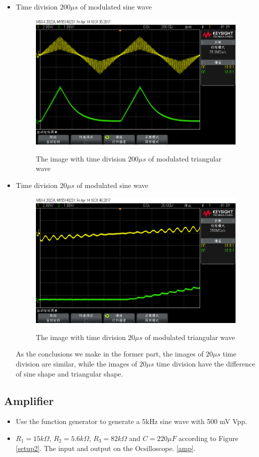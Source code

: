 \documentclass{article}
\begin{document}
\begin{itemize}
\item Time division $200\mu s$ of modulated sine wave
\begin{figure}[htbp]
	\centering
		\includegraphics[width=0.7\linewidth]{33.png}
		\label{fig-3-3}
	\caption{The image with time division $200\mu s$ of modulated triangular wave}
\end{figure}

\item Time division $20\mu s$ of modulated sine wave
\begin{figure}[htbp]
	\centering
		\includegraphics[width=0.7\linewidth]{34.png}
		\label{fig-3-4}
	\caption{The image with time division $20\mu s$ of modulated triangular wave}
\end{figure}
As the conclusions we make in the former part, the images of $20\mu s$ time division are similar, while the images of $20\mu s$ time division have the difference of sine shape and triangular shape.
\end{itemize}


\subsection{Amplifier}
\begin{itemize}
\item  Use the function generator to generate a 5kHz sine wave with 500 mV Vpp.
\item  $R_1 = 15k\Omega$, $R_2 = 5.6k\Omega$, $R_3 = 82k\Omega$ and $C = 220\mu F$ according to Figure \ref{setup2}. The input and output on the Ocsilloscope.  \ref{amp}.
\end{itemize}
\end{document}

